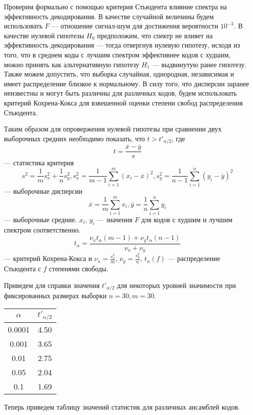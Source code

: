 Проверим формально с помощью критерия Стьюдента влияние спектра на эффективность декодирования.
В качестве случайной величины будем использовать $F$ --- отношение сигнал-шум для достижения вероятности
$10^{-3}$. В качестве нулевой гипотезы $H_0$ предположим, что спектр не влияет на эффективность декодирования
--- тогда отвергнув нулевую гипотезу, исходя из того, что в среднем коды с лучшим спектром эффективнее
кодов с худшим, можно принять как альтернативную гипотезу $H_1$ --- выдвинутую ранее гипотезу. Также
можем допустить, что выборка случайная, однородная, независимая и имеет распределение близкое к нормальному.
В силу того, что дисперсии заранее неизвестны и могут быть различны для различных кодов, будем
использовать критерий Кохрена-Кокса для взвешенной оценки степени свобод распределения Стьюдента.
\pagebreak

Таким образом для опровержения нулевой гипотезы при сравнении двух выборочных средних необходимо
показать, что $t > t'_{\alpha/2}$, где 
\[
	t=\frac{\overline{x}-\overline{y}}{s}
\]
--- статистика критерия
\[
 s^2=\frac{1}{m}s_x^2+\frac{1}{n}s_y^2,
	s_x^2=\frac{1}{m-1}\sum_{i=1}^{m}(x_i-\overline{x})^2,s_y^2=\frac{1}{n-1}\sum_{i=1}^{n}(y_i-\overline{y})^2
\]
--- выборочные дисперсии
\[
\overline{x}=\frac{1}{m}\sum_{i=1}^{m}x_i, \overline{y}=\frac{1}{n}\sum_{i=1}^{n}y_i
\]
--- выборочные средние. $x_i$, $y_i$ --- значения $F$ для кодов с худшим и лучшим спектром соответственно.
\[
	t_{\alpha}=\frac{\nu_x t_{\alpha}(m-1)+\nu_y t_{\alpha}(n-1)}{\nu_x+\nu_y}
\]
--- критерий Кохрена-Кокса
и $\nu_x=\frac{s_x^2}{m}$, $\nu_y=\frac{s_y^2}{n}$, $t_{\alpha}(f)$ --- распределение Стьюдента с $f$
степенями свободы.

Приведем для справки значения $t'_{\alpha/2}$ для некоторых уровней значимости при фиксированных
размерах выборки $n=30, m=30$.

\begin{tabular}{|c|c|}
	\hline
	$\alpha$ & $t'_{\alpha/2}$ \\
	\hline
	0.0001 & 4.50 \\
	\hline
	0.001 & 3.65 \\
	\hline
	0.01 & 2.75 \\
	\hline
	0.05 & 2.04 \\
	\hline
	0.1 & 1.69 \\
	\hline
\end{tabular}

Теперь приведем таблицу значений статистик для различных ансамблей кодов.

